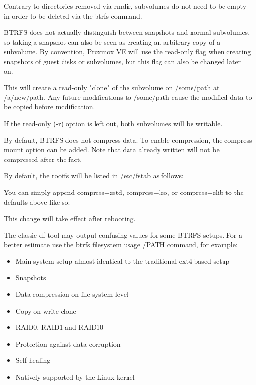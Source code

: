 Contrary to directories removed via rmdir, subvolumes do not need to be empty in order to be deleted via the btrfs command.

BTRFS does not actually distinguish between snapshots and normal subvolumes, so taking a snapshot can also be seen as creating an arbitrary copy of a subvolume. By convention, Proxmox VE will use the read-only flag when creating snapshots of guest disks or subvolumes, but this flag can also be changed later on.

This will create a read-only "clone" of the subvolume on /some/path at /a/new/path. Any future modifications to /some/path cause the modified data to be copied before modification.

If the read-only (-r) option is left out, both subvolumes will be writable.

By default, BTRFS does not compress data. To enable compression, the compress mount option can be added. Note that data already written will not be compressed after the fact.

By default, the rootfs will be listed in /etc/fstab as follows:

You can simply append compress=zstd, compress=lzo, or compress=zlib to the defaults above like so:

This change will take effect after rebooting.

The classic df tool may output confusing values for some BTRFS setups. For a better estimate use the btrfs filesystem usage /PATH command, for example:

\begin{itemize}[leftmargin=2cm]

	\item Main system setup almost identical to the traditional ext4 based setup

	\item Snapshots

	\item Data compression on file system level

	\item Copy-on-write clone

	\item RAID0, RAID1 and RAID10

	\item Protection against data corruption

	\item Self healing

	\item Natively supported by the Linux kernel

\end{itemize}

